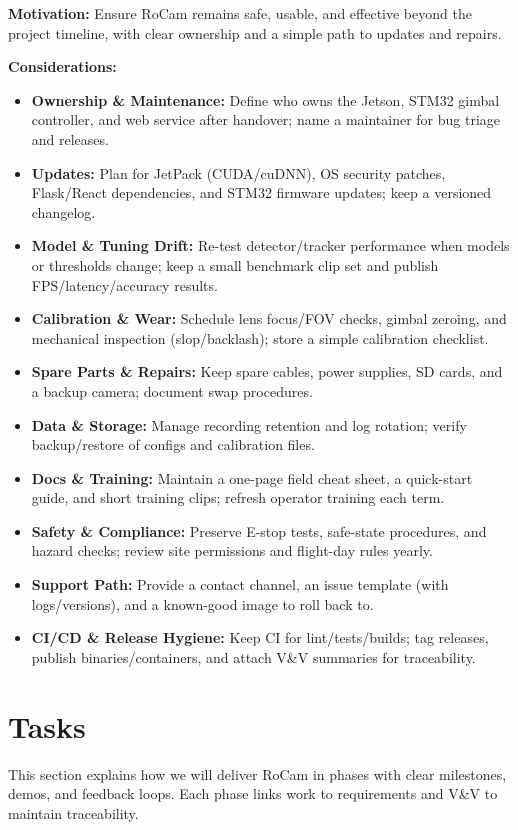 \documentclass[12pt]{article}
\begin{document}
\textbf{Motivation:} Ensure RoCam remains safe, usable, and effective beyond the project timeline, with clear ownership and a simple path to updates and repairs.

\textbf{Considerations:}
\begin{itemize}
  \item \textbf{Ownership \& Maintenance:} Define who owns the Jetson, STM32 gimbal controller, and web service after handover; name a maintainer for bug triage and releases.
  \item \textbf{Updates:} Plan for JetPack (CUDA/cuDNN), OS security patches, Flask/React dependencies, and STM32 firmware updates; keep a versioned changelog.
  \item \textbf{Model \& Tuning Drift:} Re-test detector/tracker performance when models or thresholds change; keep a small benchmark clip set and publish FPS/latency/accuracy results.
  \item \textbf{Calibration \& Wear:} Schedule lens focus/FOV checks, gimbal zeroing, and mechanical inspection (slop/backlash); store a simple calibration checklist.
  \item \textbf{Spare Parts \& Repairs:} Keep spare cables, power supplies, SD cards, and a backup camera; document swap procedures.
  \item \textbf{Data \& Storage:} Manage recording retention and log rotation; verify backup/restore of configs and calibration files.
  \item \textbf{Docs \& Training:} Maintain a one-page field cheat sheet, a quick-start guide, and short training clips; refresh operator training each term.
  \item \textbf{Safety \& Compliance:} Preserve E-stop tests, safe-state procedures, and hazard checks; review site permissions and flight-day rules yearly.
  \item \textbf{Support Path:} Provide a contact channel, an issue template (with logs/versions), and a known-good image to roll back to.
  \item \textbf{CI/CD \& Release Hygiene:} Keep CI for lint/tests/builds; tag releases, publish binaries/containers, and attach V\&V summaries for traceability.
\end{itemize}




\section{Tasks}
This section explains how we will deliver RoCam in phases with clear milestones, demos, and feedback loops.
Each phase links work to requirements and V\&V to maintain traceability.
\end{document}
